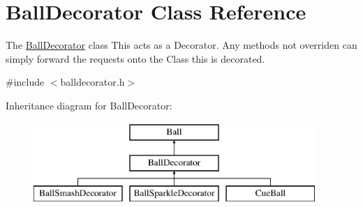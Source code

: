 \hypertarget{class_ball_decorator}{}\section{Ball\+Decorator Class Reference}
\label{class_ball_decorator}


The \mbox{\hyperlink{class_ball_decorator}{Ball\+Decorator}} class This acts as a Decorator. Any methods not overriden can simply forward the requests onto the Class this is decorated.  




{\ttfamily \#include $<$balldecorator.\+h$>$}

Inheritance diagram for Ball\+Decorator\+:\begin{figure}[H]
\begin{center}
\leavevmode
\includegraphics[height=3.000000cm]{class_ball_decorator}
\end{center}
\end{figure}
